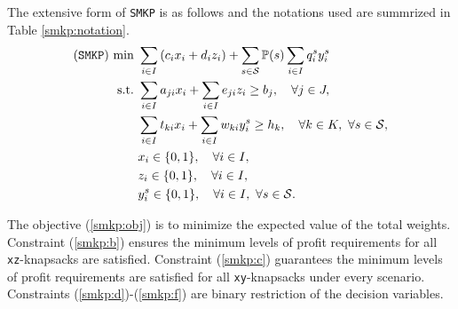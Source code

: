 The extensive form of \texttt{SMKP} is as follows and the notations used are summrized in Table \ref{smkp:notation}.
\begin{subequations}
	\begin{align}
	(\texttt{SMKP})\ \textrm{min}\ &\sum_{i \in I}\left(c_i x_i + d_i z_i\right) + \sum_{s\in\mathcal{S}}\operatorname*{\mathbb{P}}(s)\sum_{i\in I}q_i^s y_i^s \label{smkp:obj}\\
	\textrm{s.t.}\ &  \sum_{i\in I}a_{ji}x_{i} + \sum_{i \in I}e_{ji}z_i\ge b_j,\quad\forall j\in J, \label{smkp:b}\\
	&  \sum_{i\in I} t_{ki}x_i + \sum_{i\in I}w_{ki} y_i^s\ge h_k,\quad\forall k\in K,\ \forall s\in\mathcal{S}, \label{smkp:c}\\
	&  x_i\in\{0,1\},\quad\forall i\in I, \label{smkp:d}\\
	&  z_i\in\{0,1\},\quad\forall i\in I, \label{smkp:e}\\
	&  y_i^s\in\{0,1\},\quad\forall i\in I,\ \forall s\in \mathcal{S}. \label{smkp:f}
	\end{align}
\end{subequations}

The objective (\ref{smkp:obj}) is to minimize the expected value of the total weights. Constraint (\ref{smkp:b}) ensures the minimum levels of profit requirements for all \texttt{xz}-knapsacks are satisfied. Constraint (\ref{smkp:c}) guarantees the minimum levels of profit requirements are satisfied for all \texttt{xy}-knapsacks under every scenario. Constraints (\ref{smkp:d})-(\ref{smkp:f}) are binary restriction of the decision variables.

